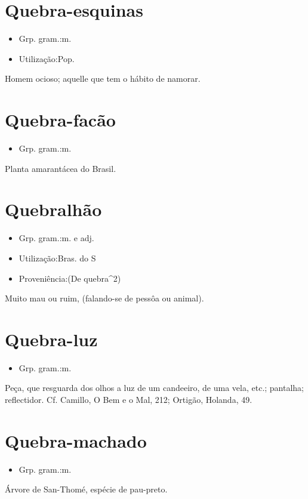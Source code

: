 \section{Quebra-esquinas}
\begin{itemize}
\item {Grp. gram.:m.}
\end{itemize}
\begin{itemize}
\item {Utilização:Pop.}
\end{itemize}
Homem ocioso; aquelle que tem o hábito de namorar.
\section{Quebra-facão}
\begin{itemize}
\item {Grp. gram.:m.}
\end{itemize}
Planta amarantácea do Brasil.
\section{Quebralhão}
\begin{itemize}
\item {Grp. gram.:m.  e  adj.}
\end{itemize}
\begin{itemize}
\item {Utilização:Bras. do S}
\end{itemize}
\begin{itemize}
\item {Proveniência:(De \textunderscore quebra\textunderscore ^2)}
\end{itemize}
Muito mau ou ruim, (falando-se de pessôa ou animal).
\section{Quebra-luz}
\begin{itemize}
\item {Grp. gram.:m.}
\end{itemize}
Peça, que resguarda dos olhos a luz de um candeeiro, de uma vela, etc.; pantalha; reflectidor. Cf. Camillo, \textunderscore O Bem e o Mal\textunderscore , 212; Ortigão, \textunderscore Holanda\textunderscore , 49.
\section{Quebra-machado}
\begin{itemize}
\item {Grp. gram.:m.}
\end{itemize}
Árvore de San-Thomé, espécie de pau-preto.
